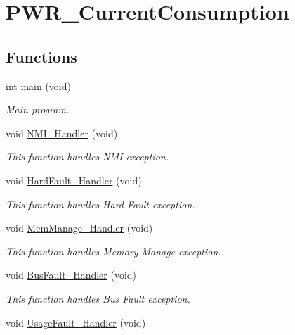 \hypertarget{group___p_w_r___current_consumption}{\section{P\-W\-R\-\_\-\-Current\-Consumption}
\label{group___p_w_r___current_consumption}
}
\subsection*{Functions}
\begin{DoxyCompactItemize}
\item 
int \hyperlink{group___p_w_r___current_consumption_ga840291bc02cba5474a4cb46a9b9566fe}{main} (void)
\begin{DoxyCompactList}\small\item\em Main program. \end{DoxyCompactList}\item 
void \hyperlink{group___p_w_r___current_consumption_ga6ad7a5e3ee69cb6db6a6b9111ba898bc}{N\-M\-I\-\_\-\-Handler} (void)
\begin{DoxyCompactList}\small\item\em This function handles N\-M\-I exception. \end{DoxyCompactList}\item 
void \hyperlink{group___p_w_r___current_consumption_ga2bffc10d5bd4106753b7c30e86903bea}{Hard\-Fault\-\_\-\-Handler} (void)
\begin{DoxyCompactList}\small\item\em This function handles Hard Fault exception. \end{DoxyCompactList}\item 
void \hyperlink{group___p_w_r___current_consumption_ga3150f74512510287a942624aa9b44cc5}{Mem\-Manage\-\_\-\-Handler} (void)
\begin{DoxyCompactList}\small\item\em This function handles Memory Manage exception. \end{DoxyCompactList}\item 
void \hyperlink{group___p_w_r___current_consumption_ga850cefb17a977292ae5eb4cafa9976c3}{Bus\-Fault\-\_\-\-Handler} (void)
\begin{DoxyCompactList}\small\item\em This function handles Bus Fault exception. \end{DoxyCompactList}\item 
void \hyperlink{group___p_w_r___current_consumption_ga1d98923de2ed6b7309b66f9ba2971647}{Usage\-Fault\-\_\-\-Handler} (void)

\end{DoxyCompactItemize}
